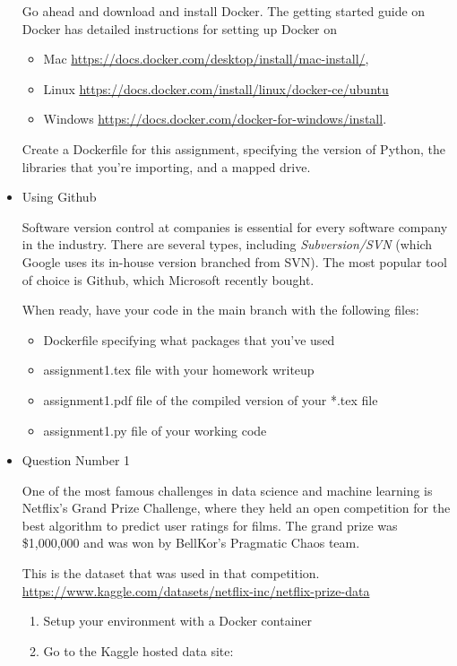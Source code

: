 \documentclass{cs6220-assignment}
\begin{document}
\begin{itemize}
Go ahead and download and install Docker. The getting started guide on Docker has detailed instructions for setting up Docker on 
\begin{itemize}
    \item Mac \url{https://docs.docker.com/desktop/install/mac-install/},
    \item Linux \url{https://docs.docker.com/install/linux/docker-ce/ubuntu}
    \item Windows \url{https://docs.docker.com/docker-for-windows/install}.
\end{itemize}

Create a Dockerfile for this assignment, specifying the version of Python, the libraries that you're importing, and a mapped drive.

\item Using Github

Software version control at companies is essential for every software company in the industry. There are several types, including \emph{Subversion/SVN} (which Google uses its in-house version branched from SVN). The most popular tool of choice is Github, which Microsoft recently bought.

When ready, have your code in the main branch with the following files:

\begin{itemize}
    \item Dockerfile specifying what packages that you've used
    \item assignment1.tex file with your homework writeup
    \item assignment1.pdf file of the compiled version of your *.tex file
    \item assignment1.py file of your working code
\end{itemize}

\item Question Number 1

One of the most famous challenges in data science and machine learning is Netflix's Grand Prize Challenge, where they held an open competition for the best algorithm to predict user ratings for films. The grand prize was \$1,000,000 and was won by BellKor's Pragmatic Chaos team. 

This is the dataset that was used in that competition.
\url{https://www.kaggle.com/datasets/netflix-inc/netflix-prize-data}

\begin{enumerate}
	\item Setup your environment with a Docker container
        \item Go to the Kaggle hosted data site:
 

\end{enumerate}
\end{itemize}
\end{document}
